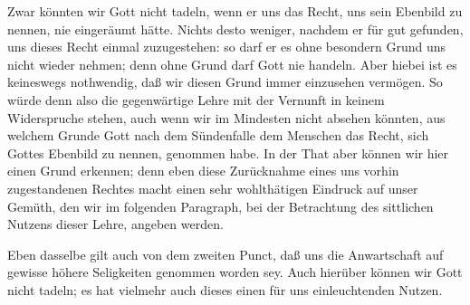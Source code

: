 \begin{aufza}
\item Zwar könnten wir Gott nicht tadeln, wenn er uns das Recht, uns sein Ebenbild zu nennen, nie eingeräumt hätte. Nichts desto weniger, nachdem er für gut gefunden, uns dieses Recht einmal zuzugestehen: so darf er es ohne besondern Grund uns nicht wieder nehmen; denn ohne Grund darf Gott nie handeln. Aber hiebei ist es keineswegs nothwendig, daß wir diesen Grund immer einzusehen vermögen. So würde denn also die gegenwärtige Lehre mit der Vernunft in keinem Widerspruche stehen, auch wenn wir im Mindesten nicht absehen könnten, aus welchem Grunde Gott nach dem Sündenfalle dem Menschen das Recht, sich Gottes Ebenbild zu nennen, genommen habe. In der That aber können wir hier einen Grund erkennen; denn eben diese Zurücknahme eines uns vorhin zugestandenen Rechtes macht einen sehr wohlthätigen Eindruck auf unser Gemüth, den wir im folgenden Paragraph, bei der Betrachtung des sittlichen Nutzens dieser Lehre, angeben werden.
\item Eben dasselbe gilt auch von dem zweiten Punct, daß uns die Anwartschaft auf gewisse höhere Seligkeiten genommen worden sey. Auch hierüber können wir Gott nicht tadeln; es hat vielmehr auch dieses einen für uns einleuchtenden Nutzen.

\end{aufza}
